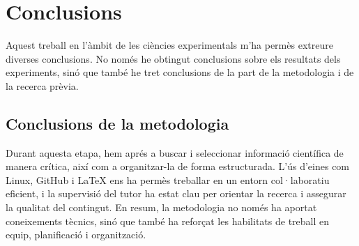 \chapter{Conclusions}
\label{c:conclusions}

%
%
%

Aquest treball en l'àmbit de les ciències experimentals m'ha permès extreure diverses conclusions. No només he obtingut conclusions sobre els resultats dels experiments, sinó que també he tret conclusions de la part de la metodologia i de la recerca prèvia.

\section{Conclusions de la metodologia}

Durant aquesta etapa, hem aprés a buscar i seleccionar informació científica de manera crítica, així com a organitzar-la de forma estructurada. L’ús d’eines com Linux, GitHub i LaTeX ens ha permès treballar en un entorn col·laboratiu eficient, i la supervisió del tutor ha estat clau per orientar la recerca i assegurar la qualitat del contingut. En resum, la metodologia no només ha aportat coneixements tècnics, sinó que també ha reforçat les habilitats de treball en equip, planificació i organització.

